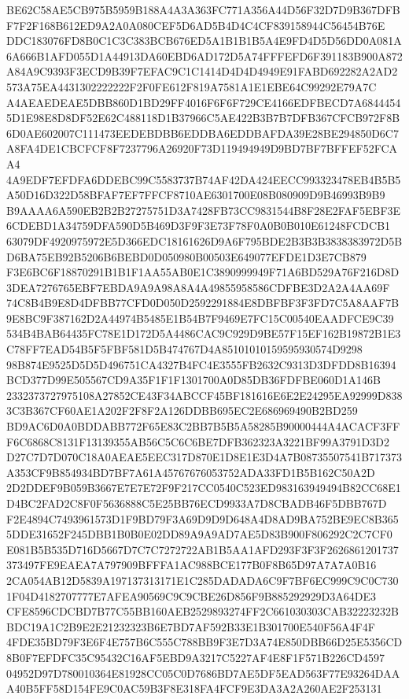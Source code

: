 \documentclass[UTF8,fontset=fandol,zihao=-4,a4paper]{ctexart}
\begin{document}
{{BE62C58AE5CB975B5959B188A4A3A363FC771A356A44D56F32D7D9B367DFBF7F2F168B612ED9A2A0A080CEF5D6AD5B4D4C4CF839158944C56454B76E
DDC183076FD8B0C1C3C383BCB676ED5A1B1B1B5A4E9FD4D5D56DD0A081A6A666B1AFD055D1A44913DA60EBD6AD172D5A74FFFEFD6F391183B900A872
A84A9C9393F3ECD9B39F7EFAC9C1C1414D4D4D4949E91FABD692282A2AD2573A75EA4431302222222F2F0FE612F819A7581A1E1EBE64C99292E79A7C
A4AEAEDEAE5DBB860D1BD29FF4016F6F6F729CE4166EDFBECD7A68444545D1E98E8D8DF52E62C488118D1B37966C5AE422B3B7B7DFB367CFCB972F8B
6D0AE602007C111473EEDEBDBB6EDDBA6EDDBAFDA39E28BE294850D6C7A8FA4DE1CBCFCF8F7237796A26920F73D119494949D9BD7BF7BFFEF52FCAA4
4A9EDF7EFDFA6DDEBC99C5583737B74AF42DA424EECC993323478EB4B5B5A50D16D322D58BFAF7EF7FFCF8710AE6301700E08B080909D9B46993B9B9
B9AAAA6A590EB2B2B27275751D3A7428FB73CC9831544B8F28E2FAF5EBF3E6CDEBD1A34759DFA590D5B469D3F9F3E73F78F0A0B0B010E61248FCDCB1
63079DF4920975972E5D366EDC18161626D9A6F795BDE2B3B3B3838383972D5BD6BA75EB92B5206B6BEBD0D050980B00503E649077EFDE1D3E7CB879
F3E6BC6F18870291B1B1F1AA55AB0E1C3890999949F71A6BD529A76F216D8D3DEA7276765EBF7EBDA9A9A98A8A4A49855958586CDFBE3D2A2A4AA69F
74C8B4B9E8D4DFBB77CFD0D050D2592291884E8DBFBF3F3FD7C5A8AAF7B9E8BC9F387162D2A44974B5485E1B54B7F9469E7FC15C00540EAADFCE9C39
534B4BAB64435FC78E1D172D5A4486CAC9C929D9BE57F15EF162B19872B1E3C78FF7EAD54B5F5FBF581D5B474767D4A85101010159595930574D9298
98B874E9525D5D5D496751CA4327B4FC4E3555FB2632C9313D3DFDD8B16394BCD377D99E505567CD9A35F1F1F1301700A0D85DB36FDFBE060D1A146B
2332373727975108A27852CE43F34ABCCF45BF181616E6E2E24295EA92999D8383C3B367CF60AE1A202F2F8F2A126DDBB695EC2E686969490B2BD259
BD9AC6D0A0BDDABB772F65E83C2BB7B5B5A58285B90000444A4ACACF3FFF6C6868C8131F13139355AB56C5C6C6BE7DFB362323A3221BF99A3791D3D2
D27C7D7D070C18A0AEAE5EEC317D870E1D8E1E3D4A7B08735507541B717373A353CF9B854934BD7BF7A61A45767676053752ADA33FD1B5B162C50A2D
2D2DDEF9B059B3667E7E7E72F9F217CC0540C523ED983163949494B82CC68E1D4BC2FAD2C8F0F5636888C5E25BB76ECD9933A7D8CBADB46F5DBB767D
F2E4894C7493961573D1F9BD79F3A69D9D9D648A4D8AD9BA752BE9EC8B3655DDE31652F245DBB1B0B0E02DD89A9A9AD7AE5D83B900F806292C2C7CF0
E081B5B535D716D5667D7C7C7272722AB1B5AA1AFD293F3F3F2626861201737373497FE9EAEA7A797909BFFFA1AC988BCE177B0F8B65D97A7A7A0B16
2CA054AB12D5839A197137313171E1C285DADADA6C9F7BF6EC999C9C0C7301F04D4182707777E7AFEA90569C9C9CBE26D856F9B885292929D3A64DE3
CFE8596CDCBD7B77C55BB160AEB2529893274FF2C661030303CAB32223232BBDC19A1C2B9E2E21232323B6E7BD7AF592B33E1B301700E540F56A4F4F
4FDE35BD79F3E6F4E757B6C555C788BB9F3E7D3A74E850DBB66D25E5356CD8B0F7EFDFC35C95432C16AF5EBD9A3217C5227AF4E8F1F571B226CD4597
04952D97D780010364E81928CC05C0D7686BD7AE5DF5EAD563F77E93264DAAA40B5FF58D154FE9C0AC59B3F8E318FA4FCF9E3DA3A2A260AE2F253131
}}
\end{document}
